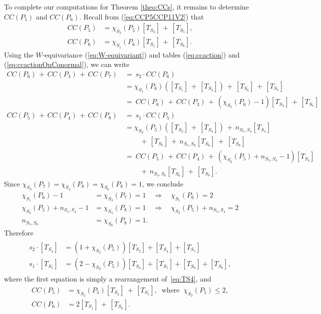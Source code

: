 \documentclass[a4paper, 11pt]{article}
\begin{document}
To complete our computations for Theorem \ref{theo:CCs}, it remains to
determine $CC(P_5)$ and $CC(P_6)$. Recall from (\ref{eq:CCP5CCP11V2}) that 
\begin{align*}
CC(P_5)&=\chi^{}_{S_2}(P_5)[T_{S_2}]\, +\, 
[T_{S_5}],\\
CC(P_6)&=\chi^{}_{S_1}(P_6)[T_{S_1}]\, +\, 
[T_{S_6}].
\end{align*}
Using the $W$-equivariance (\ref{eq:W-equivariant})
and tables (\ref{eq:ccaction}) and (\ref{eq:ccactionOnConormal}),  
we can write
\begin{align*}
CC(P_6)\, +\, CC(P_3)\, +\, CC(P_7)\ 
&=\ s_{2}\cdot CC(P_6)\\ 
&=\chi_{S_1}(P_6)([T_{S_1}]\, +\, [T_{S_3}])\, + \,[T_{S_6}]\, +\,
  [T_{S_7}]\\
&=\ CC(P_6) \, +\, CC(P_3) \, +\,
 \left(\chi_{S_1}(P_6)-1\right) [T_{S_3}] \, +\,  [T_{S_7}]\\
CC(P_5)\, +\, CC(P_4)\, +\, CC(P_8)\ 
&=\ s_{1}\cdot CC(P_5)\\ 
&=\chi_{S_2}(P_5)([T_{S_2}]\, +\, [T_{S_4}])\, + \,
n_{S_5,S_4}[T_{S_4}]\\
&\qquad
 \, +\, [T_{S_5}]\, +\, n_{S_5,S_6}[T_{S_6}]\ +\ 
  [T_{S_8}]\\
&=\ CC(P_5) \, +\, CC(P_4) \, +\,
  \left(\chi_{S_2}(P_5)+n_{S_5,S_4}-1\right) [T_{S_4}]\\ 
 & \qquad \, +\, 
 n_{S_5,S_6}[T_{S_6}] 
 \, +\,  [T_{S_8}].
\end{align*}
Since  $\chi_{S_3}(P_7)=\chi_{S_4}(P_8)=\chi_{S_6}(P_8)=1$, we conclude
\begin{align*}
\chi_{S_1}(P_6)-1&=\chi_{S_3}(P_7)=1\quad\Longrightarrow\quad \chi_{S_1}(P_6)=2\\
\chi_{S_2}(P_5)+n_{S_5,S_4}-1&=\chi_{S_4}(P_8)=1\quad\Longrightarrow\quad \chi_{S_2}(P_5)+n_{S_5,S_4}=2\\
n_{S_5,S_6}&=\chi_{S_6}(P_8)=1.
\end{align*}
Therefore
\begin{align}\label{eq:TS4TS5}
\begin{aligned}
s_{2}\cdot [T_{S_4}]&=
(1+\chi_{S_2}(P_5))[T_{S_2}]+[T_{S_4}]
+[T_{S_5}]\\
s_{1}\cdot [T_{S_5}]&=
(2-\chi_{S_2}(P_5))[T_{S_4}]
+[T_{S_5}]+[T_{S_6}] 
 +  [T_{S_8}],
 \end{aligned}
\end{align}
where the first equation is simply a rearrangement of~\eqref{eq:TS4}, and
\begin{align}\label{eq:CCP5CCP6}
CC(P_5)&=\chi_{S_{2}}^{}(P_5)
[T_{S_2}]\ +\, [T_{S_5}],\ \text{ where }\ \chi_{S_{2}}^{}(P_5)\leq 2,\\
CC(P_6)&=
2[T_{S_1}]\, +\, [T_{S_6}].\nonumber
\end{align}
\end{document}
